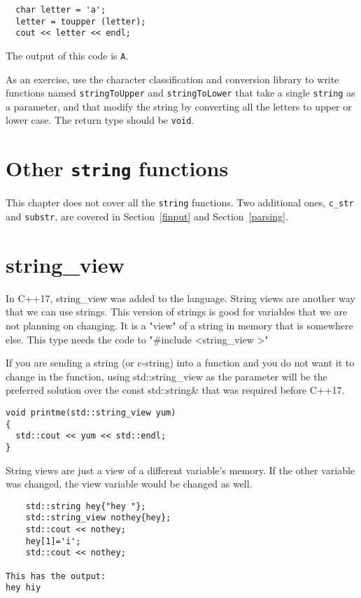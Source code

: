 \begin{verbatim}
  char letter = 'a';
  letter = toupper (letter);
  cout << letter << endl;
\end{verbatim}
%
The output of this code is {\tt A}.

As an exercise, use the character classification and conversion
library to write functions named {\tt stringToUpper} and
{\tt stringToLower} that take a single {\tt string} as
a parameter, and that modify the string by converting all the
letters to upper or lower case.  The return type should be
{\tt void}.

\section{Other {\tt string} functions}

This chapter does not cover all the {\tt string} functions.
Two additional ones, {\tt c\_str} and {\tt substr}, are covered
in Section~\ref{finput} and Section~\ref{parsing}.

\section{string\_view}
In C++17, string\_view was added to the language. String
views are another way that we can use strings. This version
of strings is good for variables that we are not planning on
changing. It is a "view" of a string in memory that is
somewhere else. This type needs the code to "\#include \textless  string\_view \textgreater"

If you are sending a string (or c-string) into a function
and you do not want it to change in the function, using std::string\_view as the parameter will be the preferred solution over the const std::string\& that 
was required before C++17.

\begin{verbatim}
void printme(std::string_view yum)
{
  std::cout << yum << std::endl;
}
\end{verbatim}

String views are just a view of a different variable's memory. If the
other variable was changed, the view variable would be changed as well.

\begin{verbatim}
    std::string hey{"hey "};
    std::string_view nothey{hey};
    std::cout << nothey;
    hey[1]='i';
    std::cout << nothey;
    
This has the output:
hey hiy
\end{verbatim}

